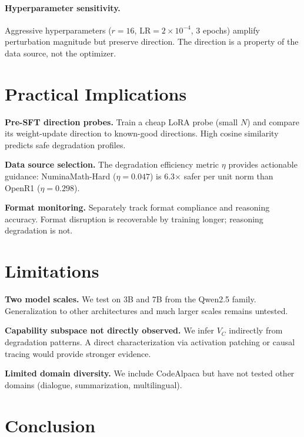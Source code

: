 \documentclass{article}
\begin{document}
\paragraph{Hyperparameter sensitivity.} Aggressive hyperparameters ($r{=}16$, LR$=2{\times}10^{-4}$, 3 epochs) amplify perturbation magnitude but preserve direction. The direction is a property of the data source, not the optimizer.

\section{Practical Implications}

\textbf{Pre-SFT direction probes.} Train a cheap LoRA probe (small $N$) and compare its weight-update direction to known-good directions. High cosine similarity predicts safe degradation profiles.

\textbf{Data source selection.} The degradation efficiency metric $\eta$ provides actionable guidance: NuminaMath-Hard ($\eta = 0.047$) is 6.3$\times$ safer per unit norm than OpenR1 ($\eta = 0.298$).

\textbf{Format monitoring.} Separately track format compliance and reasoning accuracy. Format disruption is recoverable by training longer; reasoning degradation is not.

\section{Limitations}

\textbf{Two model scales.} We test on 3B and 7B from the Qwen2.5 family. Generalization to other architectures and much larger scales remains untested.

\textbf{Capability subspace not directly observed.} We infer $V_C$ indirectly from degradation patterns. A direct characterization via activation patching or causal tracing would provide stronger evidence.

\textbf{Limited domain diversity.} We include CodeAlpaca but have not tested other domains (dialogue, summarization, multilingual).

\section{Conclusion}
\end{document}
